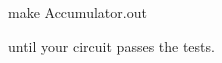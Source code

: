 \begin{bash}
make Accumulator.out
\end{bash}

\noindent 
until your circuit passes the tests.


%
%
%
%
